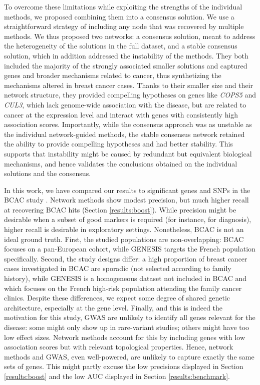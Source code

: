 \documentclass[10pt,letterpaper]{article}
\begin{document}
To overcome these limitations while exploiting the strengths of the individual methods, we proposed combining them into a consensus solution. We use a straightforward strategy of including any node that was recovered by multiple methods. We thus proposed two networks: a consensus solution, meant to address the heterogeneity of the solutions in the full dataset, and a stable consensus solution, which in addition addressed the instability of the methods. They both included the majority of the strongly associated smaller solutions and captured genes and broader mechanisms related to cancer, thus synthetizing the mechanisms altered in breast cancer cases. Thanks to their smaller size and their network structure, they provided compelling hypotheses on genes like \emph{COPS5} and \emph{CUL3}, which lack genome-wide association with the disease, but are related to cancer at the expression level and interact with genes with consistently high association scores. Importantly, while the consensus approach was as unstable as the individual network-guided methods, the stable consensus network retained the ability to provide compelling hypotheses and had better stability. This supports that instability might be caused by redundant but equivalent biological mechanisms, and hence validates the conclusions obtained on the individual solutions and the consensus.

In this work, we have compared our results to significant genes and SNPs in the BCAC study \cite{Michailidou2017}. Network methods show modest precision, but much higher recall at recovering BCAC hits (Section \ref{results:boost}). While precision might be desirable when a subset of good markers is required (for instance, for diagnosis), higher recall is desirable in exploratory settings. Nonetheless, BCAC is not an ideal ground truth.%
First, the studied populations are non-overlapping: BCAC focuses on a pan-European cohort, while GENESIS targets the French population specifically. Second, the study designs differ: a high proportion of breast cancer cases investigated in BCAC are sporadic (not selected according to family history), while GENESIS is a homogeneous dataset not included in BCAC and which focuses on the French high-risk population attending the family cancer clinics. Despite these differences, we expect some degree of shared genetic architecture, especially at the gene level. Finally, and this is indeed the motivation for this study, GWAS are unlikely to identify all genes relevant for the disease: some might only show up in rare-variant studies; others might have too low effect sizes. Network methods account for this by including genes with low association scores but with relevant topological properties. Hence, network methods and GWAS, even well-powered, are unlikely to capture exactly the same sets of genes. This might partly excuse the low precisions displayed in Section \ref{results:boost} and the low AUC displayed in Section \ref{results:benchmark}.
\end{document}
